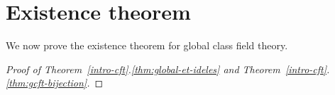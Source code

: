 \section{Existence theorem}
We now prove the existence theorem for global class field theory.
\begin{proof}[Proof of Theorem~\ref{intro-cft}.\ref{thm:global-et-ideles} and Theorem~\ref{intro-cft}.\ref{thm:gcft-bijection}]
%

\end{proof}
